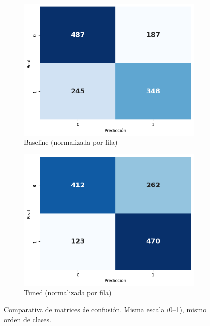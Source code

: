 \begin{figure}[h]
  \centering
  \begin{subfigure}[t]{0.48\linewidth}
    \centering
    \includegraphics[width=\linewidth]{figures/decision_tree_baseline_cm.png}
    \caption{Baseline (normalizada por fila)}
    \label{fig:cm-base}
  \end{subfigure}\hfill
  \begin{subfigure}[t]{0.48\linewidth}
    \centering
    \includegraphics[width=\linewidth]{figures/decision_tree_tunned_cm.png}
    \caption{Tuned (normalizada por fila)}
    \label{fig:cm-tuned}
  \end{subfigure}
  \caption{Comparativa de matrices de confusión. Misma escala (0–1), mismo orden de clases.}
  \label{fig:cm-compare}
\end{figure}



